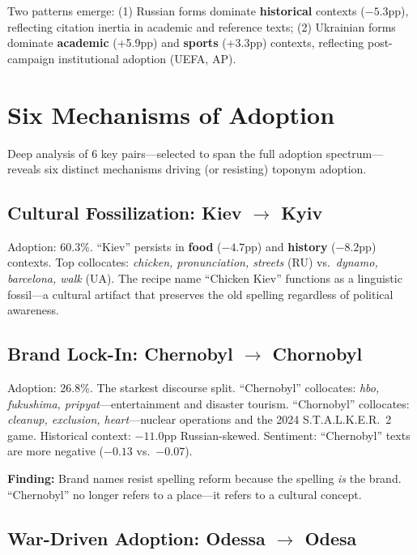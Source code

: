 \documentclass{article}
\begin{document}
Two patterns emerge: (1) Russian forms dominate \textbf{historical} contexts ($-5.3$pp), reflecting citation inertia in academic and reference texts; (2) Ukrainian forms dominate \textbf{academic} (+5.9pp) and \textbf{sports} (+3.3pp) contexts, reflecting post-campaign institutional adoption (UEFA, AP).

\section{Six Mechanisms of Adoption}
\label{sec:mechanisms}

Deep analysis of 6 key pairs---selected to span the full adoption spectrum---reveals six distinct mechanisms driving (or resisting) toponym adoption.

\subsection{Cultural Fossilization: Kiev $\to$ Kyiv}

Adoption: 60.3\%. ``Kiev'' persists in \textbf{food} ($-4.7$pp) and \textbf{history} ($-8.2$pp) contexts. Top collocates: \textit{chicken, pronunciation, streets} (RU) vs.\ \textit{dynamo, barcelona, walk} (UA). The recipe name ``Chicken Kiev'' functions as a linguistic fossil---a cultural artifact that preserves the old spelling regardless of political awareness.

\subsection{Brand Lock-In: Chernobyl $\to$ Chornobyl}

Adoption: 26.8\%. The starkest discourse split. ``Chernobyl'' collocates: \textit{hbo, fukushima, pripyat}---entertainment and disaster tourism. ``Chornobyl'' collocates: \textit{cleanup, exclusion, heart}---nuclear operations and the 2024 S.T.A.L.K.E.R.~2 game. Historical context: $-11.0$pp Russian-skewed. Sentiment: ``Chernobyl'' texts are more negative ($-0.13$ vs.\ $-0.07$).

\textbf{Finding:} Brand names resist spelling reform because the spelling \textit{is} the brand. ``Chernobyl'' no longer refers to a place---it refers to a cultural concept.

\subsection{War-Driven Adoption: Odessa $\to$ Odesa}
\end{document}
